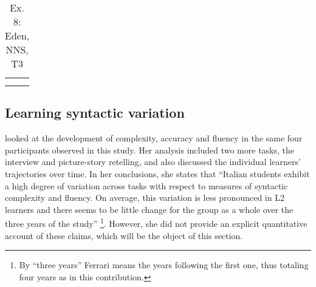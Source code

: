 \documentclass[output=paper]{langscibook}
\begin{document}
\begin{table}
\caption{Ex. 8: Eden, NNS, T3}
\label{tabex:pallotti:8}


\begin{tabularx}{\textwidth}{QQ}

\lsptoprule
{} & \\
\lspbottomrule
\end{tabularx}
\end{table}

\subsection{\label{sec:pallotti:4.2} Learning syntactic variation}

\citet{Ferrari2012} looked at the development of complexity, accuracy and fluency in the same four participants observed in this study. Her analysis included two more tasks, the interview and picture-story retelling, and also discussed the individual learners’ trajectories over time. In her conclusions, she states that “Italian students exhibit a high degree of variation across tasks with respect to measures of syntactic complexity and fluency. On average, this variation is less pronounced in L2 learners and there seems to be little change for the group as a whole over the three years of the study” \citep[291]{Ferrari2012}\footnote{By ``three years'' Ferrari means the years following the first one, thus totaling four years as in this contribution.}. However, she did not provide an explicit quantitative account of these claims, which will be the object of this section.
\end{document}
